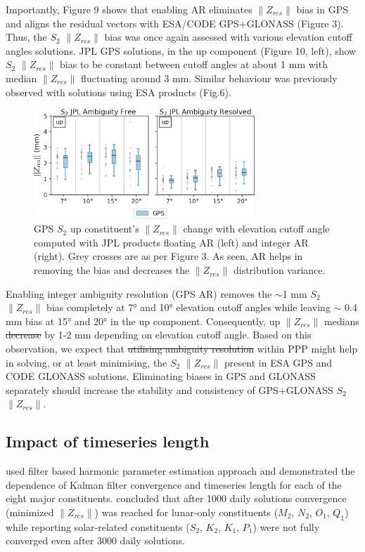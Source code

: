 \documentclass[se, manuscript]{copernicus}
\providecommand{\DIFadd}[1]{{\protect\color{blue}\uwave{#1}}} %
\providecommand{\DIFdel}[1]{{\protect\color{red}\sout{#1}}}                      %
\providecommand{\DIFaddbegin}{} %
\providecommand{\DIFaddend}{} %
\providecommand{\DIFdelbegin}{} %
\providecommand{\DIFdelend}{} %
\begin{document}
\DIFaddend Importantly, Figure 9 shows that enabling AR eliminates $\|Z_{res}\|$ bias in GPS and aligns the residual vectors with ESA/CODE GPS+GLONASS (Figure 3). Thus, the $S_2$ $\|Z_{res}\|$ bias was once again assessed with various elevation cutoff angles solutions. JPL GPS solutions, in the up component (Figure 10, left), show $S_2$ $\|Z_{res}\|$ bias to be constant between cutoff angles at about 1 mm with median $\|Z_{res}\|$ fluctuating around 3 mm. Similar behaviour was previously observed with solutions using ESA products (Fig.6).

\begin{figure}[t]
\includegraphics[width=8.3cm]{fig10.png}
\caption{GPS $S_2$ up constituent’s $\|Z_{res}\|$ change with elevation cutoff angle computed with JPL products floating AR (left) and integer AR (right). Grey crosses are as per Figure 3. As seen, AR helps in removing the bias and  decreases the $\|Z_{res}\|$ distribution variance.}
\end{figure}

Enabling integer ambiguity resolution (GPS AR) removes the $\sim$1 mm $S_2$ $\|Z_{res}\|$ bias completely at 7° and 10° elevation cutoff angles while leaving $\sim$ 0.4 mm bias at 15° and 20° in the up component. Consequently, up $\|Z_{res}\|$ medians \DIFdelbegin \DIFdel{decrease }\DIFdelend \DIFaddbegin \DIFadd{change }\DIFaddend by 1-2 mm depending on elevation cutoff angle. Based on this observation, we expect that \DIFdelbegin \DIFdel{utilising ambiguity resolution }\DIFdelend \DIFaddbegin \DIFadd{resolving ambiguities }\DIFaddend within PPP might help in solving, or at least minimising, the $S_2$ $\|Z_{res}\|$ present in ESA GPS and CODE GLONASS solutions. Eliminating biases in GPS and GLONASS separately should increase the stability and consistency of GPS+GLONASS $S_2$ $\|Z_{res}\|$.

\subsection{Impact of timeseries length}
\cite{Yuan2013} used \DIFaddbegin \DIFadd{a }\DIFaddend filter based harmonic parameter estimation approach and demonstrated the dependence of Kalman filter convergence and timeseries length for each of the eight major constituents. \cite{Yuan2013} concluded that after 1000 daily solutions convergence (minimized $\|Z_{res}\|$) was reached for lunar-only constituents ($M_2$, $N_2$, $O_1$, $Q_1$) while reporting solar-related constituents ($S_2$, $K_2$, $K_1$, $P_1$) were not fully converged even after 3000 daily solutions.
\end{document}
